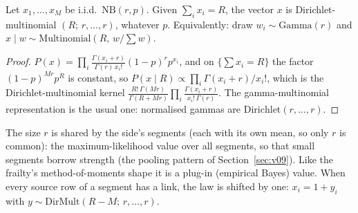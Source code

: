 \begin{proposition}\label{prop:nbdirmult}
Let $x_1,\dots,x_M$ be i.i.d.\ $\mathrm{NB}(r,p)$. Given $\sum_i x_i=R$, the vector $x$ is Dirichlet-multinomial $(R;\,r,\dots,r)$, whatever $p$. Equivalently: draw $w_i\sim\mathrm{Gamma}(r)$ and $x\mid w\sim\mathrm{Multinomial}(R,\,w/\sum w)$.
\end{proposition}
\begin{proof}
$P(x)=\prod_i \frac{\Gamma(x_i+r)}{\Gamma(r)\,x_i!}(1-p)^r p^{x_i}$, and on $\{\sum x_i=R\}$ the factor $(1-p)^{Mr}p^R$ is constant, so $P(x\mid R)\propto\prod_i \Gamma(x_i+r)/x_i!$, which is the Dirichlet-multinomial kernel $\frac{R!\,\Gamma(Mr)}{\Gamma(R+Mr)}\prod_i\frac{\Gamma(x_i+r)}{x_i!\,\Gamma(r)}$. The gamma-multinomial representation is the usual one: normalised gammas are $\mathrm{Dirichlet}(r,\dots,r)$.
\end{proof}
The size $r$ is shared by the side's segments (each with its own mean, so only $r$ is common): the maximum-likelihood value over all segments, so that small segments borrow strength (the pooling pattern of Section~\ref{sec:v09}). Like the frailty's method-of-moments shape it is a plug-in (empirical Bayes) value. When every source row of a segment has a link, the law is shifted by one: $x_i=1+y_i$ with $y\sim\mathrm{DirMult}(R-M;\,r,\dots,r)$.

